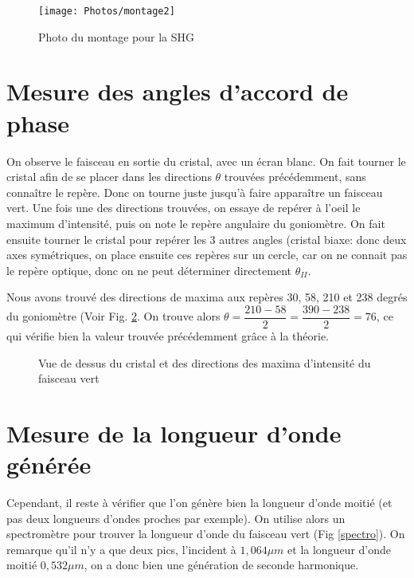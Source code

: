 \documentclass[a4paper,11pt]{report}
\begin{document}
\begin{figure}
\centering
    \texttt{[image: Photos/montage2]}
    \caption{Photo du montage pour la SHG}
    \label{montageONL}
\end{figure}
\section{Mesure des angles d'accord de phase}
On observe le faisceau en sortie du cristal, avec un écran blanc. On fait tourner le cristal afin de se placer dans les directions $\theta$ trouvées précédemment, sans connaître le repère. Donc on tourne juste jusqu'à faire apparaître un faisceau vert. Une fois une des directions trouvées, on essaye de repérer à l'oeil le maximum d'intensité, puis on note le repère angulaire du goniomètre. On fait ensuite tourner le cristal pour repérer les 3 autres angles (cristal biaxe: donc deux axes symétriques, on place ensuite ces repères sur un cercle, car on ne connait pas le repère optique, donc on ne peut déterminer directement $\theta_{II}$.

Nous avons trouvé des directions de maxima aux repères 30, 58, 210 et 238 degrés du goniomètre (Voir Fig. \ref{anglesONL}. On trouve alors $\theta=\dfrac{210-58}{2}=\dfrac{390-238}{2}=76$\textdegree, ce qui vérifie bien la valeur trouvée précédemment grâce à la théorie.

\begin{figure}
    \centering
    \caption{Vue de dessus du cristal et des directions des maxima d'intensité du faisceau vert}
    \label{anglesONL}

\end{figure}

\section{Mesure de la longueur d'onde générée}
Cependant, il reste à vérifier que l'on génère bien la longueur d'onde moitié (et pas deux longueurs d'ondes proches par exemple). On utilise alors un spectromètre pour trouver la longueur d'onde du faisceau vert (Fig \ref{spectro}). On remarque qu'il n'y a que deux pics, l'incident à $1,064\mu m$ et la longueur d'onde moitié $0,532\mu m$, on a donc bien une génération de seconde harmonique.
\end{document}

